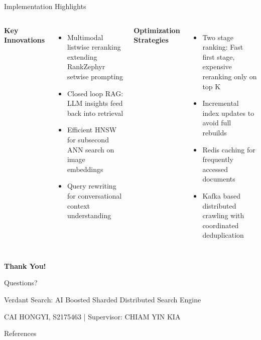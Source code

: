 \documentclass[aspectratio=169,xcolor=dvipsnames]{beamer}
\begin{document}
\begin{frame}{Implementation Highlights}
    \begin{columns}[t]
        \textbf{Key Innovations}
        \begin{itemize}
            \item Multimodal listwise reranking extending RankZephyr setwise prompting
            \item Closed loop RAG: LLM insights feed back into retrieval
            \item Efficient HNSW for subsecond ANN search on image embeddings
            \item Query rewriting for conversational context understanding
        \end{itemize}
        
        \textbf{Optimization Strategies}
        \begin{itemize}
            \item Two stage ranking: Fast first stage, expensive reranking only on top K
            \item Incremental index updates to avoid full rebuilds
            \item Redis caching for frequently accessed documents
            \item Kafka based distributed crawling with coordinated deduplication
        \end{itemize}
    \end{columns}
\end{frame}


\begin{frame}
    \Huge{\centerline{\textbf{Thank You!}}}
    
    \vspace{1cm}
    \Large{\centerline{Questions?}}
    
    \vspace{1cm}
    \normalsize
    \centerline{Verdant Search: AI Boosted Sharded Distributed Search Engine}
    \centerline{CAI HONGYI, S2175463 | Supervisor: CHIAM YIN KIA}
\end{frame}


\begin{frame}[t,allowframebreaks]{References}
    \tiny
    \printbibliography[heading=none]
\end{frame}
\end{document}
